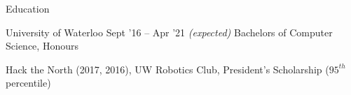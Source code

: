 \documentclass{resume} %
\begin{document}

\begin{rSection}{Education}
  \begin{rSubsection}{University of Waterloo}
		     {Sept '16 -- Apr '21 \em (expected)}
		     {Bachelors of Computer Science, Honours}
		     {}
    \item Hack the North (2017, 2016), UW Robotics Club, President's Scholarship
      ($95^{th}$ percentile)
  \end{rSubsection}
\end{rSection} 
\end{document}
